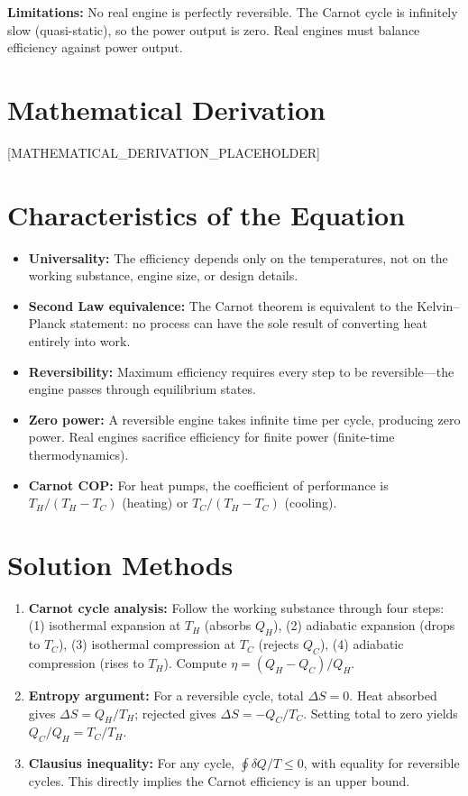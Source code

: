 \documentclass[11pt,openright]{book}
\begin{document}
\textbf{Limitations:} No real engine is perfectly reversible. The Carnot cycle is infinitely slow (quasi-static), so the power output is zero. Real engines must balance efficiency against power output.


\section*{Mathematical Derivation}

[MATHEMATICAL_DERIVATION_PLACEHOLDER]

\section*{Characteristics of the Equation}

\begin{itemize}
\item \textbf{Universality:} The efficiency depends only on the temperatures, not on the working substance, engine size, or design details.
\item \textbf{Second Law equivalence:} The Carnot theorem is equivalent to the Kelvin--Planck statement: no process can have the sole result of converting heat entirely into work.
\item \textbf{Reversibility:} Maximum efficiency requires every step to be reversible---the engine passes through equilibrium states.
\item \textbf{Zero power:} A reversible engine takes infinite time per cycle, producing zero power. Real engines sacrifice efficiency for finite power (finite-time thermodynamics).
\item \textbf{Carnot COP:} For heat pumps, the coefficient of performance is $T_H/(T_H - T_C)$ (heating) or $T_C/(T_H - T_C)$ (cooling).
\end{itemize}
\section*{Solution Methods}

\begin{enumerate}
\item \textbf{Carnot cycle analysis:} Follow the working substance through four steps: (1) isothermal expansion at $T_H$ (absorbs $Q_H$), (2) adiabatic expansion (drops to $T_C$), (3) isothermal compression at $T_C$ (rejects $Q_C$), (4) adiabatic compression (rises to $T_H$). Compute $\eta = (Q_H - Q_C)/Q_H$.
\item \textbf{Entropy argument:} For a reversible cycle, total $\Delta S = 0$. Heat absorbed gives $\Delta S = Q_H/T_H$; rejected gives $\Delta S = -Q_C/T_C$. Setting total to zero yields $Q_C/Q_H = T_C/T_H$.
\item \textbf{Clausius inequality:} For any cycle, $\oint \delta Q/T \leq 0$, with equality for reversible cycles. This directly implies the Carnot efficiency is an upper bound.
\end{enumerate}
\end{document}
